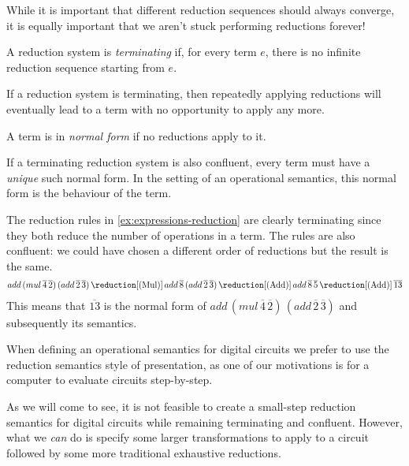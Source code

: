 While it is important that different reduction sequences should always converge,
it is equally important that we aren't stuck performing reductions forever!

\begin{definition}
    A reduction system is \emph{terminating} if, for every term \(e\), there is
    no infinite reduction sequence starting from \(e\).
\end{definition}

If a reduction system is terminating, then repeatedly applying reductions will
eventually lead to a term with no opportunity to apply any more.

\begin{definition}
    A term is in \emph{normal form} if no reductions apply to it.
\end{definition}

If a terminating reduction system is also confluent, every term must have a
\emph{unique} such normal form.
In the setting of an operational semantics, this normal form is the behaviour
of the term.

\begin{example}
    The reduction rules in \cref{ex:expressions-reduction} are clearly
    terminating since they both reduce the number of operations in a term.
    The rules are also confluent: we could have chosen a different order of
    reductions but the result is the same.
    \begin{gather*}
        add \, (mul \, \overline{4} \, \overline{2}) \, (add \, \overline{2} \, \overline{3})
        \,\reduction[(\text{Mul})]\,
        add \, \overline{8} \, (add \, \overline{2} \, \overline{3})
        \,\reduction[(\text{Add})]\,
        add \, \overline{8} \, \overline{5}
        \,\reduction[(\text{Add})]\,
        \overline{13}
    \end{gather*}
    This means that \(\overline{13}\) is the normal form of
    \(add \, (mul \, \overline{4} \, \overline{2}) \, (add \, \overline{2} \, \overline{3})\)
    and subsequently its semantics.
\end{example}

When defining an operational semantics for digital circuits we prefer to use
the reduction semantics style of presentation, as one of our motivations is for
a computer to evaluate circuits step-by-step.

As we will come to see, it is not feasible to create a small-step reduction
semantics for digital circuits while remaining terminating and confluent.
However, what we \emph{can} do is specify some larger transformations to apply
to a circuit followed by some more traditional exhaustive reductions.

